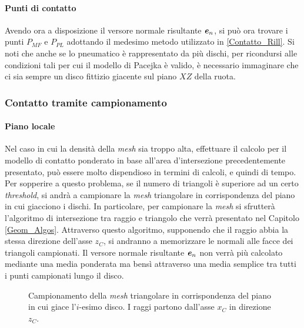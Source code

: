 \paragraph{Punti di contatto}
Avendo ora a disposizione il versore normale risultante $\textbf{\textit{e}}_n$, si può ora trovare i punti $P_{MF}$ e $P_{PL}$ adottando il medesimo metodo utilizzato in \ref{Contatto_Rill}. Si noti che anche se lo pneumatico è rappresentato da più dischi, per ricondursi alle condizioni tali per cui il modello di Pacejka è valido, è necessario immaginare che ci sia sempre un disco fittizio giacente sul piano $XZ$ della ruota.
%
\subsubsection{Contatto tramite campionamento}
\paragraph{Piano locale}
Nel caso in cui la densità della \textit{mesh} sia troppo alta, effettuare il calcolo per il modello di contatto ponderato in base all'area d'intersezione precedentemente presentato, può essere molto dispendioso in termini di calcoli, e quindi di tempo. Per sopperire a questo problema, se il numero di triangoli è superiore ad un certo \textit{threshold}, si andrà a campionare la \textit{mesh} triangolare in corrispondenza del piano in cui giacciono i dischi. In particolare, per campionare la \textit{mesh} si sfrutterà l'algoritmo di intersezione tra raggio e triangolo che verrà presentato nel Capitolo \ref{Geom_Algos}. Attraverso questo algoritmo, supponendo che il raggio abbia la stessa direzione dell'asse $z_C$, si andranno a memorizzare le normali alle facce dei triangoli campionati. Il versore normale risultante $\textbf{\textit{e}}_n$ non verrà più calcolato mediante una media ponderata ma bensì attraverso una media semplice tra tutti i punti campionati lungo il disco.

\begin{figure}
	\centering
	\caption{Campionamento della \textit{mesh} triangolare in corrispondenza del piano in cui giace l'$i$-esimo disco. I raggi partono dall'asse $x_C$ in direzione $z_C$.}
\end{figure}

